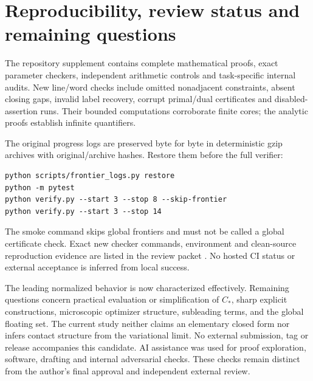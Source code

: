 \documentclass[11pt]{article}
\theoremstyle{definition}\newtheorem{definition}[theorem]{Definition}
\theoremstyle{remark}\newtheorem{remark}[theorem]{Remark}
\newcommand{\CC}{C_\ast}
\begin{document}
\section{Reproducibility, review status and remaining questions}

The repository supplement contains complete mathematical proofs, exact
parameter checkers, independent arithmetic controls and task-specific internal
audits. New line/word checks include omitted nonadjacent constraints, absent
closing gaps, invalid label recovery, corrupt primal/dual certificates and
disabled-assertion runs. Their bounded computations corroborate finite cores;
the analytic proofs establish infinite quantifiers.

The original progress logs are preserved byte for byte in deterministic gzip
archives with original/archive hashes. Restore them before the full verifier:
\begin{verbatim}
python scripts/frontier_logs.py restore
python -m pytest
python verify.py --start 3 --stop 8 --skip-frontier
python verify.py --start 3 --stop 14
\end{verbatim}
The smoke command skips global frontiers and must not be called a global
certificate check. Exact new checker commands, environment and clean-source
reproduction evidence are listed in the review packet \cite{packet}.
No hosted CI status or external acceptance is inferred from local success.

The leading normalized behavior is now characterized effectively. Remaining
questions concern practical evaluation or simplification of $\CC$, sharp
explicit constructions, microscopic optimizer structure, subleading terms,
and the global floating set. The current study neither claims an elementary
closed form nor infers contact structure from the variational limit.
No external submission, tag or release accompanies this candidate.
AI assistance was used for proof exploration, software, drafting and internal
adversarial checks. These checks remain distinct from the author's final
approval and independent external review.
\end{document}
